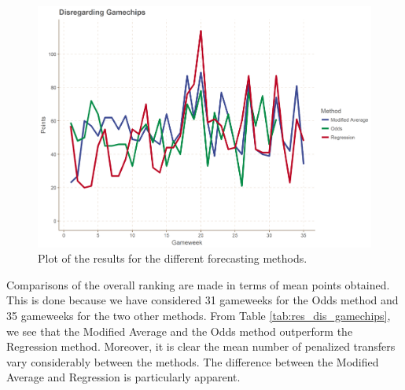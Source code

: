 \begin{figure}[H]
    \centering
    \includegraphics[scale=0.5]{fig/chapter_7/comparison_methods.png}
    \caption{Plot of the results for the different forecasting methods.}
\label{fig:res_comp_dis_gamechips}    
\end{figure}

Comparisons of the overall ranking are made in terms of mean points obtained. This is done because we have considered 31 gameweeks for the Odds method and 35 gameweeks for the two other methods. From Table \ref{tab:res_dis_gamechips}, we see that the Modified Average and the Odds method outperform the Regression method. Moreover, it is clear the mean number of penalized transfers vary considerably between the methods. The difference between the Modified Average and Regression is particularly apparent. 

\begin{table}[H]
\centering
{}
\caption{Results disregarding gamechips.}
\label{tab:res_dis_gamechips}
\end{table}



